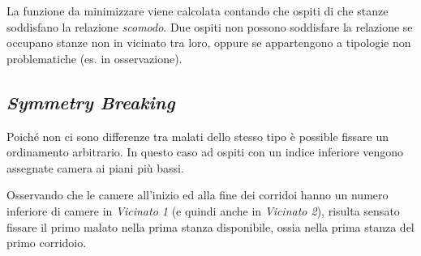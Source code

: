 \noindent
La funzione da minimizzare viene calcolata contando che ospiti di che stanze soddisfano la relazione \emph{scomodo}.
Due ospiti non possono soddisfare la relazione se occupano stanze non in vicinato tra loro, oppure se appartengono a tipologie non problematiche (es. in osservazione).


\subsection{\emph{Symmetry Breaking}}
Poiché non ci sono differenze tra malati dello stesso tipo è possible fissare un ordinamento arbitrario.
In questo caso ad ospiti con un indice inferiore vengono assegnate camera ai piani più bassi.


\noindent
Osservando che le camere all'inizio ed alla fine dei corridoi hanno un numero inferiore di camere in \emph{Vicinato 1} (e quindi anche in \emph{Vicinato 2}), risulta sensato fissare il primo malato nella prima stanza disponibile, ossia nella prima stanza del primo corridoio.

